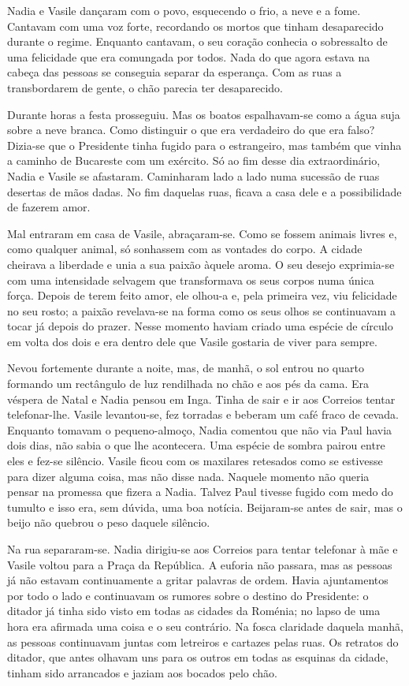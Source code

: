 Nadia e Vasile dançaram com o povo, esquecendo o frio, a neve e a fome.
Cantavam com uma voz forte, recordando os mortos que tinham
desaparecido durante o regime. Enquanto cantavam, o seu coração conhecia
o sobressalto de uma felicidade que era comungada por todos. Nada do que
agora estava na cabeça das pessoas se conseguia separar da esperança.
Com as ruas a transbordarem de gente, o chão parecia ter desaparecido.

Durante horas a festa prosseguiu. Mas os boatos espalhavam-se como a
água suja sobre a neve branca. Como distinguir o que era verdadeiro do
que era falso? Dizia-se que o Presidente tinha fugido para o
estrangeiro, mas também que vinha a caminho de Bucareste com um exército. Só ao fim desse dia extraordinário, Nadia e Vasile se afastaram.
Caminharam lado a lado numa sucessão de ruas desertas de mãos dadas. No
fim daquelas ruas, ficava a casa dele e a possibilidade de fazerem amor.

Mal entraram em casa de Vasile, abraçaram-se. Como se fossem animais
livres e, como qualquer animal, só sonhassem com as vontades do corpo. A
cidade cheirava a liberdade e unia a sua paixão àquele aroma. O seu
desejo exprimia-se com uma intensidade selvagem que transformava os seus
corpos numa única força. Depois de
terem feito amor, ele olhou-a e, pela primeira vez, viu felicidade no
seu rosto; a paixão revelava-se na forma como os seus olhos se
continuavam a tocar já depois do prazer. Nesse momento haviam criado uma
espécie de círculo em volta dos dois e era dentro dele que Vasile
gostaria de viver para sempre.

Nevou fortemente durante a noite, mas, de manhã, o sol entrou no quarto
formando um rectângulo de luz rendilhada no chão e aos pés da cama.
Era véspera de Natal e Nadia pensou em Inga. Tinha de sair e ir aos
Correios tentar telefonar-lhe. Vasile levantou-se, fez torradas e beberam um café fraco de cevada. Enquanto tomavam o pequeno-almoço, Nadia
comentou que não via Paul havia dois dias, não sabia o que lhe
acontecera. Uma espécie de sombra pairou entre eles e fez-se silêncio.
Vasile ficou com os maxilares retesados como se estivesse para dizer
alguma coisa, mas não disse nada. Naquele momento não queria pensar na
promessa que fizera a Nadia. Talvez Paul tivesse fugido com medo do
tumulto e isso era, sem dúvida, uma boa notícia. Beijaram-se antes de
sair, mas o beijo não quebrou o peso daquele silêncio.

Na rua separaram-se. Nadia dirigiu-se aos Correios
para tentar telefonar à mãe e Vasile voltou para a Praça da República. A
euforia não passara, mas as pessoas já não estavam continuamente a
gritar palavras de ordem. Havia ajuntamentos por todo o lado e
continuavam os rumores sobre o destino do Presidente: o ditador já tinha
sido visto em todas as cidades da Roménia; no lapso de uma hora era
afirmada uma coisa e o seu contrário. Na fosca claridade daquela
manhã, as pessoas continuavam juntas
com letreiros e cartazes pelas ruas. Os retratos do ditador, que antes
olhavam uns para os outros em todas as esquinas da cidade, tinham sido
arrancados e jaziam aos bocados pelo chão.

